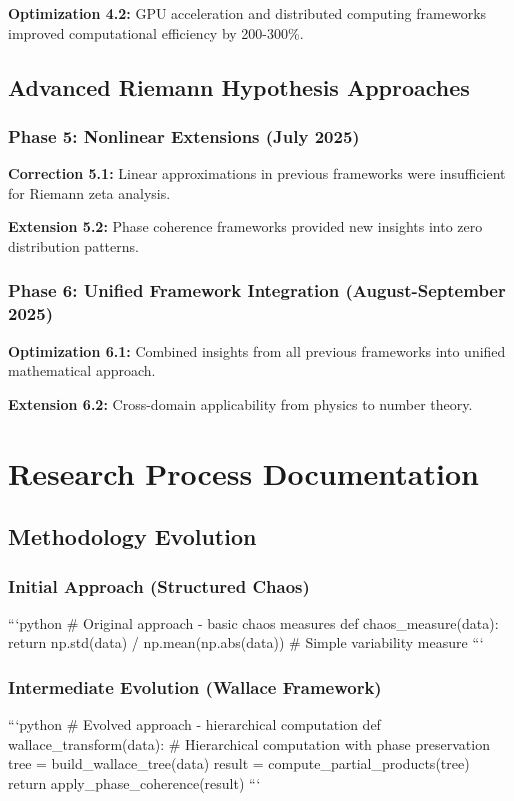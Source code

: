 \documentclass[12pt]{article}
\begin{document}
\textbf{Optimization 4.2:} GPU acceleration and distributed computing frameworks improved computational efficiency by 200-300\%.

\subsection{Advanced Riemann Hypothesis Approaches}

\subsubsection{Phase 5: Nonlinear Extensions (July 2025)}

\textbf{Correction 5.1:} Linear approximations in previous frameworks were insufficient for Riemann zeta analysis.

\textbf{Extension 5.2:} Phase coherence frameworks provided new insights into zero distribution patterns.

\subsubsection{Phase 6: Unified Framework Integration (August-September 2025)}

\textbf{Optimization 6.1:} Combined insights from all previous frameworks into unified mathematical approach.

\textbf{Extension 6.2:} Cross-domain applicability from physics to number theory.

\section{Research Process Documentation}

\subsection{Methodology Evolution}

\subsubsection{Initial Approach (Structured Chaos)}
```python
# Original approach - basic chaos measures
def chaos_measure(data):
    return np.std(data) / np.mean(np.abs(data))  # Simple variability measure
```

\subsubsection{Intermediate Evolution (Wallace Framework)}
```python
# Evolved approach - hierarchical computation
def wallace_transform(data):
    # Hierarchical computation with phase preservation
    tree = build_wallace_tree(data)
    result = compute_partial_products(tree)
    return apply_phase_coherence(result)
```
\end{document}
